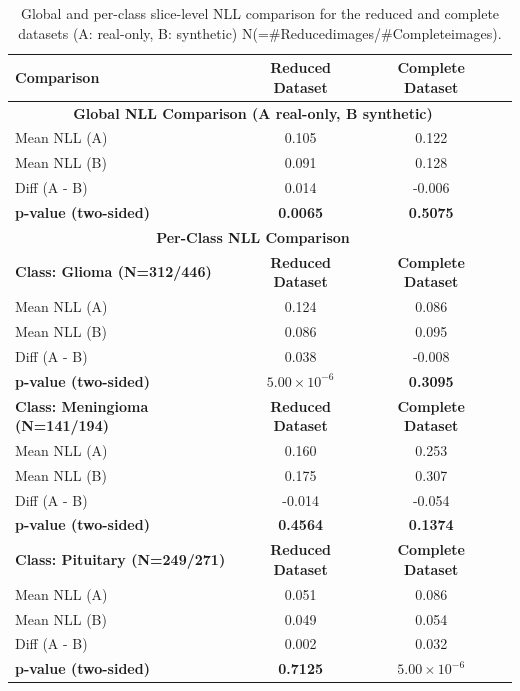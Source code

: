 \begin{table}[ht]
\centering
\caption{Global and per-class slice-level NLL comparison for the reduced and complete datasets (A: real-only, B: synthetic) N(=\#Reducedimages/\#Completeimages).}
\begin{tabular}{lccc}
\toprule
\textbf{Comparison} & \textbf{Reduced Dataset} & \textbf{Complete Dataset} \\
\midrule
\multicolumn{3}{c}{\textbf{Global NLL Comparison (A real-only, B synthetic)}} \\
\midrule
Mean NLL (A) & 0.105 & 0.122 \\
Mean NLL (B) & 0.091 & 0.128 \\
Diff (A - B) & 0.014 & -0.006 \\
\textbf{p-value (two-sided)} & \textbf{0.0065} & \textbf{0.5075} \\
\midrule
\multicolumn{3}{c}{\textbf{Per-Class NLL Comparison}} \\
\midrule
\textbf{Class: Glioma (N=312/446)} & \textbf{Reduced Dataset} & \textbf{Complete Dataset} \\
Mean NLL (A) & 0.124 & 0.086 \\
Mean NLL (B) & 0.086 & 0.095 \\
Diff (A - B) & 0.038 & -0.008 \\
\textbf{p-value (two-sided)} & \textbf{$5.00 \times 10^{-6}$} & \textbf{0.3095} \\
\midrule
\textbf{Class: Meningioma (N=141/194)} & \textbf{Reduced Dataset} & \textbf{Complete Dataset} \\
Mean NLL (A) & 0.160 & 0.253 \\
Mean NLL (B) & 0.175 & 0.307 \\
Diff (A - B) & -0.014 & -0.054 \\
\textbf{p-value (two-sided)} & \textbf{0.4564} & \textbf{0.1374} \\
\midrule
\textbf{Class: Pituitary (N=249/271)} & \textbf{Reduced Dataset} & \textbf{Complete Dataset} \\
Mean NLL (A) & 0.051 & 0.086 \\
Mean NLL (B) & 0.049 & 0.054 \\
Diff (A - B) & 0.002 & 0.032 \\
\textbf{p-value (two-sided)} & \textbf{0.7125} & \textbf{$5.00 \times 10^{-6}$} \\
\bottomrule
\end{tabular}
\label{tab:nll_comparison}
\end{table}

